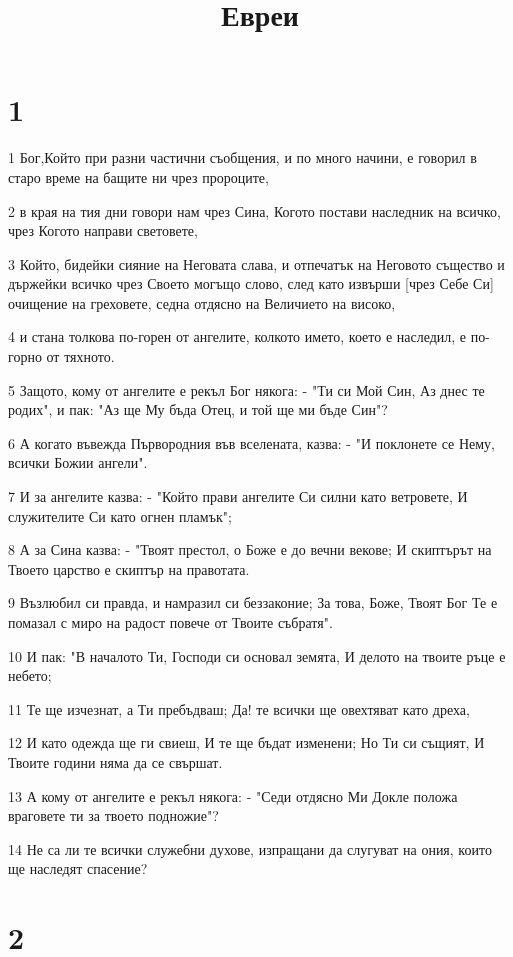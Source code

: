 

\title{Евреи}


\chapter{1}

\par 1 Бог,Който при разни частични съобщения, и по много начини, е говорил в старо време на бащите ни чрез пророците,
\par 2 в края на тия дни говори нам чрез Сина, Когото постави наследник на всичко, чрез Когото направи световете,
\par 3 Който, бидейки сияние на Неговата слава, и отпечатък на Неговото същество и държейки всичко чрез Своето могъщо слово, след като извърши [чрез Себе Си] очищение на греховете, седна отдясно на Величието на високо,
\par 4 и стана толкова по-горен от ангелите, колкото името, което е наследил, е по-горно от тяхното.
\par 5 Защото, кому от ангелите е рекъл Бог някога: - "Ти си Мой Син, Аз днес те родих", и пак: "Аз ще Му бъда Отец, и той ще ми бъде Син"?
\par 6 А когато въвежда Първородния във вселената, казва: - "И поклонете се Нему, всички Божии ангели".
\par 7 И за ангелите казва: - "Който прави ангелите Си силни като ветровете, И служителите Си като огнен пламък";
\par 8 А за Сина казва: - "Твоят престол, о Боже е до вечни векове; И скиптърът на Твоето царство е скиптър на правотата.
\par 9 Възлюбил си правда, и намразил си беззаконие; За това, Боже, Твоят Бог Те е помазал с миро на радост повече от Твоите събратя".
\par 10 И пак: "В началото Ти, Господи си основал земята, И делото на твоите ръце е небето;
\par 11 Те ще изчезнат, а Ти пребъдваш; Да! те всички ще овехтяват като дреха,
\par 12 И като одежда ще ги свиеш, И те ще бъдат изменени; Но Ти си същият, И Твоите години няма да се свършат.
\par 13 А кому от ангелите е рекъл някога: - "Седи отдясно Ми Докле положа враговете ти за твоето подножие"?
\par 14 Не са ли те всички служебни духове, изпращани да слугуват на ония, които ще наследят спасение?

\chapter{2}

